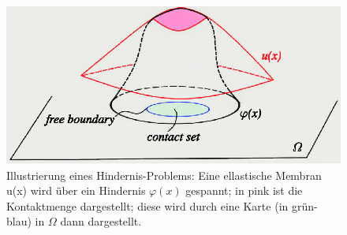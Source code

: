 \begin{figure}[!h]
    \centering
    \includegraphics[scale=0.4]{figures/Example-of-an-obstacle-problem.png}
    \caption{Illustrierung eines Hindernis-Problems: Eine ellastische Membran u(x) wird über ein Hindernis \(\varphi(x)\) gespannt; in pink ist die Kontaktmenge dargestellt; diese wird durch eine Karte (in grün-blau) in \(\Omega\) dann dargestellt. \cite{ObstacleProblem}}
    \label{fig:obs}
\end{figure}

